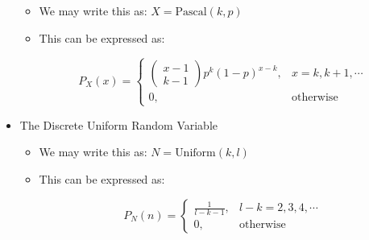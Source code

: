 \begin{itemize}
    \begin{itemize}

      \item We may write this as: $X=\text{Pascal}(k,p)$

      \item This can be expressed as:

        $$P_X(x)=\left\{ \begin{array}{ll} \left( \begin{matrix} x-1\\k-1\end{matrix} \right)p^k(1-p)^{x-k},&x=k,k+1,\cdots\\0,&\text{otherwise}\end{array}$$

    \end{itemize}

  \item The Discrete Uniform Random Variable

    \begin{itemize}

      \item We may write this as: $N=\text{Uniform}(k,l)$

      \item This can be expressed as:

        $$P_N(n)=\left\{ \begin{array}{ll} \frac{1}{l-k-1},&l-k=2,3,4,\cdots\\0,&\text{otherwise}\end{array}$$

    \end{itemize}

\end{itemize}



